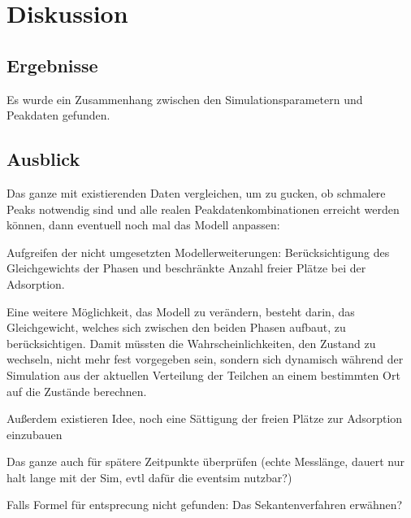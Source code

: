 \chapter{Diskussion}
\label{chapter:dis}

\section{Ergebnisse}
Es wurde ein Zusammenhang zwischen den Simulationsparametern und Peakdaten gefunden.


\section{Ausblick}

Das ganze mit existierenden Daten vergleichen, um zu gucken, ob schmalere Peaks notwendig sind und alle realen Peakdatenkombinationen erreicht werden können, dann eventuell noch mal das Modell anpassen:

Aufgreifen der nicht umgesetzten Modellerweiterungen: Berücksichtigung des Gleichgewichts der Phasen und beschränkte Anzahl freier Plätze bei der Adsorption.

Eine weitere Möglichkeit, das Modell zu verändern, besteht darin, das Gleichgewicht, welches sich zwischen den beiden Phasen aufbaut, zu berücksichtigen. Damit müssten die Wahrscheinlichkeiten, den Zustand zu wechseln, nicht mehr fest vorgegeben sein, sondern sich dynamisch während der Simulation aus der aktuellen Verteilung der Teilchen an einem bestimmten Ort auf die Zustände berechnen.

Außerdem existieren Idee, noch eine Sättigung der freien Plätze zur Adsorption einzubauen

Das ganze auch für spätere Zeitpunkte überprüfen (echte Messlänge, dauert nur halt lange mit der Sim, evtl dafür die eventsim nutzbar?)


Falls Formel für entsprecung nicht gefunden: Das Sekantenverfahren erwähnen?

